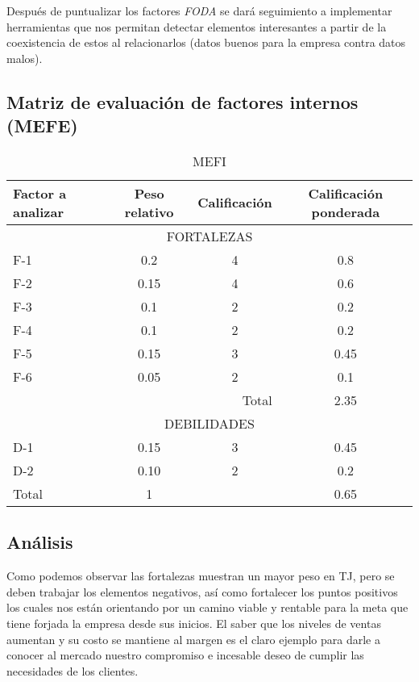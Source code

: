 	Después de puntualizar los factores \textit{FODA} se dará seguimiento a implementar herramientas que nos permitan detectar elementos interesantes a partir de la coexistencia de estos al relacionarlos (datos buenos para la empresa contra datos malos).
	\newpage
	\subsection{Matriz de evaluación de factores internos \textbf{(MEFE)}}
\begin{table}[h]
\centering
\begin{tabular}{l|c|c|c}
\hline\hline \rowcolor{LightBlue2} Factor a analizar& Peso relativo &Calificación&Calificación ponderada\\ \hline\hline
\multicolumn{4}{c}{FORTALEZAS}\\ \hline
F-1& 0.2 		& 4& 0.8 \\
F-2 & 0.15 & 4& 0.6 \\
F-3 & 0.1 	& 2&  0.2\\
F-4 & 0.1 	& 2&  0.2\\
F-5 & 0.15 & 3&  0.45\\
F-6 & 0.05 & 2&  0.1\\\hline
\multicolumn{3}{r}{Total}& 2.35\\ \hline
\multicolumn{4}{c}{DEBILIDADES}\\ \hline
D-1& 0.15 & 3& 0.45\\
D-2 & 0.10 & 2& 0.2\\\hline
Total&1 & & 0.65\\ \hline
\end{tabular}
\caption{MEFI}
\end{table}

\subsection{Análisis}
	Como podemos observar las fortalezas muestran un mayor peso en TJ, pero se deben trabajar los elementos negativos, así como fortalecer 
	los puntos positivos los cuales nos están orientando por un camino viable y rentable para la meta que tiene forjada la empresa desde sus inicios.
	El saber que los niveles de ventas aumentan y su costo se mantiene al margen es el claro ejemplo para darle a conocer al mercado nuestro compromiso 	e incesable deseo de cumplir las necesidades de los clientes.